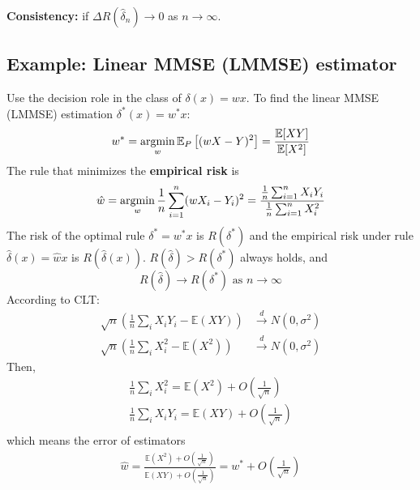 \documentclass[11pt]{elegantbook}
\newcommand{\argmin}{\operatornamewithlimits{argmin}}
\begin{document}
\textbf{Consistency:} if $\Delta R(\hat{\delta}_n) \rightarrow 0$ as $n \rightarrow \infty$.

\subsection{Example: Linear MMSE (LMMSE) estimator}
Use the decision role in the class of $\delta(x)=wx$. To find the linear MMSE (LMMSE) estimation $\delta^*(x)=w^*x$:
\begin{equation}
    \begin{aligned}
        w^*=\argmin_{w}\mathbb{E}_P\left[(wX-Y)^2\right]=\frac{\mathbb{E}[XY]}{\mathbb{E}[X^2]}
    \end{aligned}
    \nonumber
\end{equation}
The rule that minimizes the \textbf{empirical risk} is
\begin{equation}
    \begin{aligned}
        \hat{w}=\argmin_{w}\frac{1}{n}\sum_{i=1}^n(wX_i-Y_i)^2=\frac{\frac{1}{n}\sum_{i=1}^nX_iY_i}{\frac{1}{n}\sum_{i=1}^nX_i^2}
    \end{aligned}
    \nonumber
\end{equation}
The risk of the optimal rule $\delta^*=w^*x$ is $R(\delta^*)$ and the empirical risk under rule $\hat{\delta}(x)=\hat{w}x$ is $R(\hat{\delta}(x))$. $R(\hat{\delta})>R(\delta^*)$ always holds, and $$R(\hat{\delta})\rightarrow R(\delta^*)\text{ as }n \rightarrow \infty$$
According to CLT:
\begin{equation}
    \begin{aligned}
        \sqrt{n}\left(\frac{1}{n}\sum_iX_iY_i- \mathbb{E}(XY)\right) &\stackrel{d}{\longrightarrow} N(0,\sigma^2)\\
        \sqrt{n}\left(\frac{1}{n}\sum_iX_i^2- \mathbb{E}(X^2)\right) &\stackrel{d}{\longrightarrow} N(0,\sigma^2)
    \end{aligned}
    \nonumber
\end{equation}
Then,
\begin{equation}
    \begin{aligned}
        \frac{1}{n}\sum_iX_i^2=\mathbb{E}(X^2)+O(\frac{1}{\sqrt{n}})\\
        \frac{1}{n}\sum_iX_iY_i=\mathbb{E}(XY)+O(\frac{1}{\sqrt{n}})\\
    \end{aligned}
    \nonumber
\end{equation}
which means the error of estimators
\begin{equation}
    \begin{aligned}
        \hat{w}=\frac{\mathbb{E}(X^2)+O(\frac{1}{\sqrt{n}})}{\mathbb{E}(XY)+O(\frac{1}{\sqrt{n}})}=w^*+O(\frac{1}{\sqrt{n}})
    \end{aligned}
    \nonumber
\end{equation}
\end{document}

